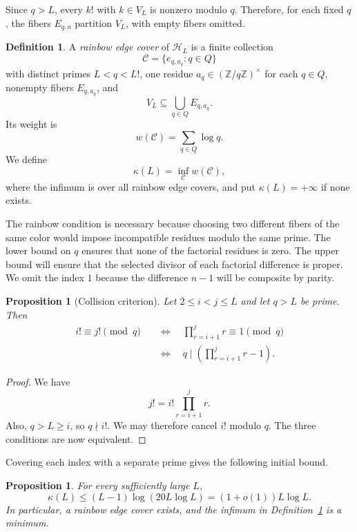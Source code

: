 \documentclass[11pt]{amsart}
\newtheorem{proposition}[theorem]{Proposition}
\theoremstyle{definition}
\newtheorem{definition}[theorem]{Definition}
\theoremstyle{remark}
\begin{document}
Since $q>L$, every $k!$ with $k\in V_L$ is nonzero modulo $q$.  Therefore,
for each fixed $q$, the fibers $E_{q,a}$ partition $V_L$, with empty fibers
omitted.

\begin{definition}\label{def:cover}
A \emph{rainbow edge cover} of $\mathcal H_L$ is a finite collection
\[
\mathcal C=\{e_{q,a_q}:q\in Q\}
\]
with distinct primes $L<q<L!$, one residue $a_q\in(\mathbb Z/q\mathbb Z)^\times$
for each $q\in Q$, nonempty fibers $E_{q,a_q}$, and
\[
V_L\subseteq\bigcup_{q\in Q}E_{q,a_q}.
\]
Its weight is
\[
w(\mathcal C)=\sum_{q\in Q}\log q.
\]
We define
\[
\kappa(L)=\inf_{\mathcal C}w(\mathcal C),
\]
where the infimum is over all rainbow edge covers, and put
$\kappa(L)=+\infty$ if none exists.
\end{definition}

The rainbow condition is necessary because choosing two different fibers of
the same color would impose incompatible residues modulo the same prime.
The lower bound on $q$ ensures that none of the factorial residues is zero.
The upper bound will ensure that the selected divisor of each factorial
difference is proper.  We omit the index $1$ because the difference $n-1$
will be composite by parity.

\begin{proposition}[Collision criterion]\label{prop:criterion}
Let $2\leq i<j\leq L$ and let $q>L$ be prime.  Then
\[
\begin{aligned}
i!\equiv j!\pmod q
&\quad\Longleftrightarrow\quad
\prod_{r=i+1}^{j}r\equiv1\pmod q\\
&\quad\Longleftrightarrow\quad
q\mid\left(\prod_{r=i+1}^{j}r-1\right).
\end{aligned}
\]
\end{proposition}

\begin{proof}
We have
\[
j!=i!\prod_{r=i+1}^{j}r.
\]
Also, $q>L\geq i$, so $q\nmid i!$.  We may therefore cancel $i!$ modulo
$q$.  The three conditions are now equivalent.
\end{proof}

Covering each index with a separate prime gives the following initial bound.

\begin{proposition}\label{prop:baseline}
For every sufficiently large $L$,
\[
\kappa(L)\leq(L-1)\log(20L\log L)
=(1+o(1))L\log L.
\]
In particular, a rainbow edge cover exists, and the infimum in
Definition~\ref{def:cover} is a minimum.
\end{proposition}
\end{document}
